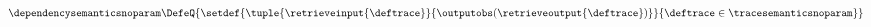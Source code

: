 
\begin{gather*}
  \dependencysemanticsnoparam \DefeQ \{
    \setdef{
      \tuple{\retrieveinput{\deftrace}}{\outputobs(\retrieveoutput{\deftrace})}
    }{
      \deftrace \in \tracesemanticsnoparam
    }
  \}
\end{gather*}
